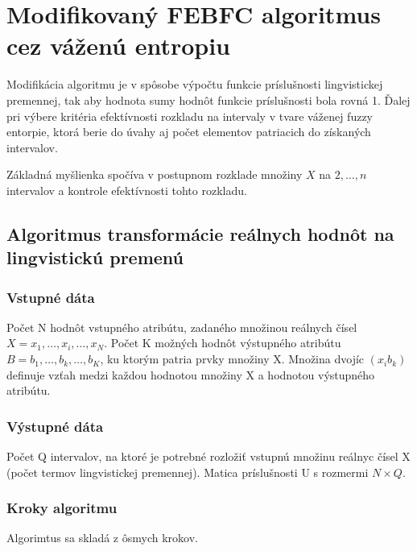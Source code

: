 \section{Modifikovaný FEBFC algoritmus cez váženú entropiu }

Modifikácia algoritmu je v spôsobe výpočtu funkcie príslušnosti lingvistickej premennej, tak aby hodnota sumy hodnôt funkcie príslušnosti bola rovná 1. Ďalej pri výbere kritéria efektívnosti rozkladu na intervaly v tvare váženej fuzzy entorpie, ktorá berie do úvahy aj počet elementov patriacich do získaných intervalov. \cite{levashenkoProj}

Základná myšlienka spočíva v postupnom rozklade množiny $X$ na $2,\ldots, n$ intervalov a kontrole efektívnosti tohto rozkladu. 


\subsection{Algoritmus transformácie reálnych hodnôt na lingvistickú premenú }

\subsubsection{Vstupné dáta}
Počet N hodnôt vstupného atribútu, zadaného množinou reálnych čísel $X={x_1, \ldots,x_i, \ldots, x_N}$. 
Počet K možných hodnôt výstupného atribútu $B={b_1, \ldots, b_k, \ldots, b_K}$, ku ktorým patria prvky množiny X. Množina dvojíc $(x_i b_k)$ definuje  vzťah medzi každou hodnotou množiny X a hodnotou výstupného atribútu. \cite{levashenkoProj}

\subsubsection{Výstupné dáta}
Počet Q intervalov, na ktoré je potrebné rozložiť vstupnú množinu reálnyc čísel X (počet termov lingvistickej premennej). Matica príslušnosti U s rozmermi $N \times Q$. \cite{levashenkoProj}

\subsubsection{Kroky algoritmu}
Algorimtus sa skladá z ôsmych krokov. 

